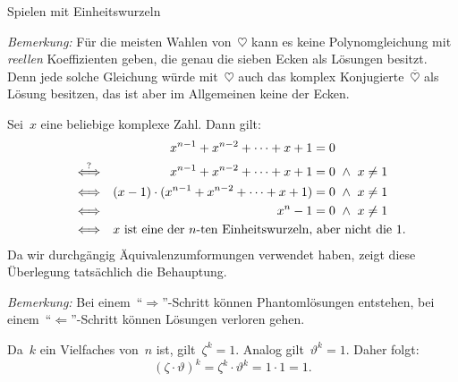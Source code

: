 \documentclass{algblatt}
\begin{document}
\begin{aufgabe}{Spielen mit Einheitswurzeln}
\begin{loesungE}
\emph{Bemerkung:} Für die meisten Wahlen von~$\heartsuit$ kann es keine
Polynomgleichung mit \emph{reellen} Koeffizienten geben, die genau die sieben
Ecken als Lösungen besitzt. Denn jede solche Gleichung würde mit~$\heartsuit$
auch das komplex Konjugierte~$\overline{\heartsuit}$ als Lösung besitzen, das
ist aber im Allgemeinen keine der Ecken.

\item Sei~$x$ eine beliebige komplexe Zahl. Dann gilt:
\begin{align*}
  && x^{n-1} + x^{n-2} + \cdots + x + 1 &= 0 \\
  \stackrel{?}{\Longleftrightarrow} &&
    x^{n-1} + x^{n-2} + \cdots + x + 1 &= 0 \ \wedge\  x \neq 1 \\
  \Longleftrightarrow &&
    (x - 1) \cdot (x^{n-1} + x^{n-2} + \cdots + x + 1) &= 0 \ \wedge\  x \neq 1 \\
  \Longleftrightarrow &&
    x^n - 1 &= 0 \ \wedge\  x \neq 1 \\
  \Longleftrightarrow &&
    \omit\rlap{\text{$x$ ist eine der~$n$-ten Einheitswurzeln, aber nicht
    die~$1$.}}
\end{align*}
Da wir durchgängig Äquivalenzumformungen verwendet haben, zeigt diese
Überlegung tatsächlich die Behauptung.

\emph{Bemerkung:} Bei einem~"`$\Rightarrow$"'-Schritt können Phantomlösungen
entstehen, bei einem~"`$\Leftarrow$"'-Schritt können Lösungen verloren gehen.

\item Da~$k$ ein Vielfaches von~$n$ ist, gilt~$\zeta^k = 1$. Analog
gilt~$\vartheta^k = 1$. Daher folgt:
\[ (\zeta \cdot \vartheta)^k = \zeta^k \cdot \vartheta^k = 1 \cdot 1 = 1. \]
\end{loesungE}
\end{aufgabe}
\end{document}
